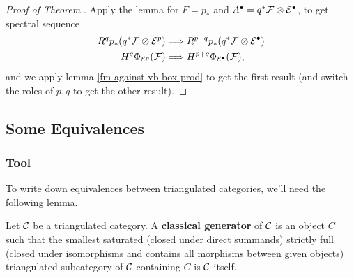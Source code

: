 \documentclass[12pt]{article}
\begin{document}
\begin{proof}[Proof of Theorem.]
    Apply the lemma for $F=p_*$ and $A^\bullet = q^*\mathcal{F} \otimes \mathcal{E}^\bullet$, to get spectral sequence
    \begin{align*}
        R^q p_*(q^*\mathcal{F} \otimes \mathcal{E}^p) &\Longrightarrow R^{p+q} p_*(q^*\mathcal{F} \otimes \mathcal{E}^\bullet)\\
        H^q \Phi_{\mathcal{E}^p}(\mathcal{F}) &\Longrightarrow H^{p+q} \Phi_{\mathcal{E}^\bullet}(\mathcal{F}),
    \end{align*}
    and we apply lemma \ref{fm-against-vb-box-prod} to get the first result (and switch the roles of $p,q$ to get the other result).
\end{proof}

\subsection{Some Equivalences}

\subsubsection{Tool}

To write down equivalences between triangulated categories, we'll need the following lemma.

\begin{defn}
    Let $\mathcal{C}$ be a triangulated category. A \textbf{classical generator} of $\mathcal{C}$ is an object $C$ such that the smallest saturated (closed under direct summands) strictly full (closed under isomorphisms and contains all morphisms between given objects) triangulated subcategory of $\mathcal{C}$ containing $C$ is $\mathcal{C}$ itself.
\end{defn}
\end{document}
